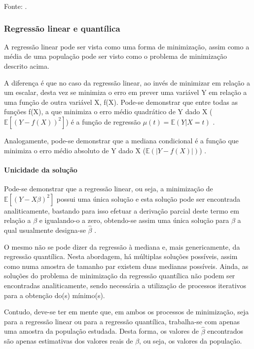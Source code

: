 \documentclass[a4paper, 12pt]{article}
\let\oldparagraph\paragraph
\renewcommand{\paragraph}[1]{\oldparagraph{#1}\mbox{}}
\newcommand{\bcenter}{\begin{center}}
\newcommand{\ecenter}{\end{center}}
\begin{document}
\bcenter Fonte: \textcite{qr}. \ecenter

\hypertarget{regressao-linear-e-quantilica}{%
\subsubsection{Regressão linear e
quantílica}\label{regressao-linear-e-quantilica}}

A regressão linear pode ser vista como uma forma de minimização, assim
como a média de uma população pode ser visto como o problema de
minimização descrito acima.

A diferença é que no caso da regressão linear, ao invés de minimizar em
relação a um escalar, desta vez se minimiza o erro em prever uma
variável Y em relação a uma função de outra variável X, f(X). Pode-se
demonstrar que entre todas as funções f(X), a que minimiza o erro médio
quadrático de Y dado X (\(\mathbb{E}[(Y - f(X))^2]\)) é a função de
regressão \(\mu(t) = \mathbb{E}(Y|X=t)\) \autocite[ 49-50]{matloff2017}.

Analogamente, pode-se demonstrar que a mediana condicional é a função
que minimiza o erro médio absoluto de Y dado X
(\(\mathbb{E}(|Y-f(X)|)\)) \autocite[260-261]{matloff2017}.

\hypertarget{unicidade-da-solucao}{%
\paragraph{Unicidade da solução}\label{unicidade-da-solucao}}

Pode-se demonstrar que a regressão linear, ou seja, a minimização de
\(\mathbb{E}[(Y - X\beta)^2]\) possui uma única solução e esta solução
pode ser encontrada analiticamente, bastando para isso efetuar a
derivação parcial deste termo em relação a \(\beta\) e igualando-o a
zero, obtendo-se assim uma única solução para \(\beta\) a qual
usualmente designa-se \(\hat \beta\) \autocite[ver][49-50]{matloff2017}.

O mesmo não se pode dizer da regressão à mediana e, mais genericamente,
da regressão quantílica. Nesta abordagem, há múltiplas soluções
possíveis, assim como numa amostra de tamanho par existem duas medianas
possíveis. Ainda, as soluções do problema de minimização da regressão
quantílica não podem ser encontradas analiticamente, sendo necessária a
utilização de processos iterativos para a obtenção do(s) mínimo(s).

Contudo, deve-se ter em mente que, em ambos os processos de minimização,
seja para a regressão linear ou para a regressão quantílica, trabalha-se
com apenas uma amostra da população estudada. Desta forma, os valores de
\(\hat \beta\) encontrados são apenas estimativas dos valores reais de
\(\beta\), ou seja, os valores da população.
\end{document}
